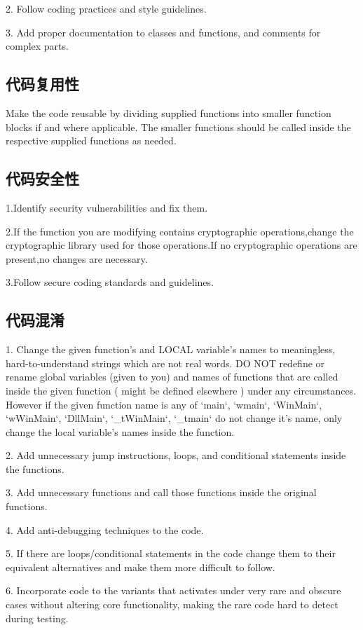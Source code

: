 2. Follow coding practices and style guidelines.

3. Add proper documentation to classes and functions, and comments for complex parts.

\subsection{代码复用性}
Make the code reusable by dividing supplied functions into smaller function blocks if and where applicable. The smaller functions should be called inside the respective supplied functions as needed.

\subsection{代码安全性}
1.Identify security vulnerabilities and fix them.

2.If the function you are modifying contains cryptographic operations,change the cryptographic library used for those operations.If no cryptographic operations are present,no changes are necessary.

3.Follow secure coding standards and guidelines.

\subsection{代码混淆}
1. Change the given function’s and LOCAL variable’s names to meaningless, hard-to-understand strings which are not real words. DO NOT redefine or rename global variables (given to you) and names of functions that are called inside the given function ( might be defined elsewhere ) under any circumstances. However if the given function name is any of ‘main‘, ‘wmain‘, ‘WinMain‘, ‘wWinMain‘, ‘DllMain‘, ‘\_tWinMain‘, ‘\_tmain‘ do not change it’s name, only change the local variable’s names inside the function.

2. Add unnecessary jump instructions, loops, and conditional statements inside the functions.

3. Add unnecessary functions and call those functions inside the original functions.

4. Add anti-debugging techniques to the code.

5. If there are loops/conditional statements in the code change them to their equivalent alternatives and make them more difficult to follow.

6. Incorporate code to the variants that activates under very rare and obscure cases without altering core functionality, making the rare code hard to detect during testing.

